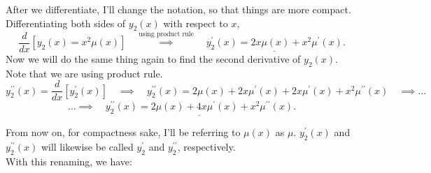 \documentclass[a4paper,12pt]{article} %
\begin{document}
 After we differentiate, I'll change the notation, so that things are more compact. Differentiating both sides of $y_2(x)$ with respect to $x$,
 $$ \frac{d}{dx}\left[y_2(x) = x^2\mu(x)\right] \quad\overset{\text{using product rule}}\implies \quad \underline{y^{\prime}_2(x) = 2x\mu(x) + x^2\mu^{\prime}(x)}.$$
 Now we will do the same thing again to find the second derivative of $y_2(x)$. Note that we are using product rule.
 $$ y^{\prime \prime}_2(x) = \frac{d}{dx}[y^{\prime}_2(x)] \quad\implies \quad y^{\prime \prime}_2(x) = 2\mu(x) + 2x\mu^{\prime}(x) + 2x\mu^{\prime}(x) + x^2\mu^{\prime \prime}(x) \quad\implies \ldots $$
 $$\ldots\implies \quad \underline{y^{\prime \prime}_2(x) = 2\mu(x) + 4x\mu^{\prime}(x) + x^2\mu^{\prime \prime}(x)}. $$
 
 From now on, for compactness sake, I'll be referring to $\mu(x)$ as $\mu$.  $y^{\prime}_2(x)$ and $y^{\prime \prime}_2(x)$ will likewise be called $y^{\prime}_2$ and $y^{\prime \prime}_2$, respectively.\\
 
 With this renaming, we have:
 
\end{document}
